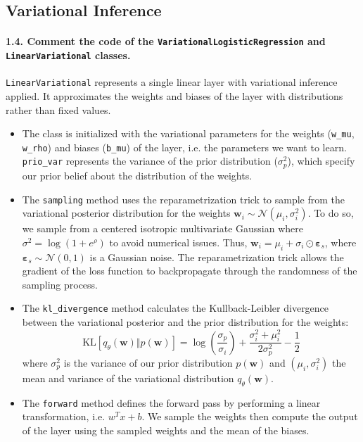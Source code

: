 \subsection{Variational Inference}
\paragraph{1.4. Comment the code of the \texttt{VariationalLogisticRegression} and \texttt{LinearVariational} classes.}

\noindent\texttt{LinearVariational} represents a single linear layer with variational inference applied. It approximates the weights and biases of the layer with distributions rather than fixed values.
\begin{itemize}
    \item The class is initialized with the variational parameters for the weights (\texttt{w\_mu}, \texttt{w\_rho}) and biases (\texttt{b\_mu}) of the layer, i.e. the parameters we want to learn. \texttt{prio\_var} represents the variance of the prior distribution ($\sigma^2_p$), which specify our prior belief about the distribution of the weights. 
    \item The \texttt{sampling} method uses the reparametrization trick to sample from the variational posterior distribution for the weights $\boldsymbol{w}_{i} \sim \mathcal{N}(\mu_{i}, \sigma_{i}^2)$. To do so, we sample from a centered isotropic multivariate Gaussian where $ \sigma^2 = \log(1 + e^{\rho}) $ to avoid numerical issues. Thus, $ \boldsymbol{w}_{i} = \mu_{i}+ \sigma_{i} \odot \boldsymbol{\varepsilon}_s $, where $\boldsymbol{\varepsilon}_s \sim \mathcal{N}(0, 1)$ is a Gaussian noise. The reparametrization trick allows the gradient of the loss function to backpropagate through the randomness of the sampling process. 
    \item The \texttt{kl\_divergence} method calculates the Kullback-Leibler divergence between the variational posterior and the prior distribution for the weights: \[
    \textrm{KL}\left[q_{\theta}(\boldsymbol{w}) \Vert p(\boldsymbol{w}) \right]= \log\left(\frac{\sigma_{p}}{\sigma_{i}}\right) + \frac{\sigma_i^2+\mu_i^2}{2\sigma_{p}^2} - \frac{1}{2} \]
    where $\sigma^2_p$ is the variance of our prior distribution $p(\boldsymbol{w})$ and $(\mu_i, \sigma^2_i)$ the mean and variance of the variational distribution $q_{\theta}(\boldsymbol{w})$.
    \item The \texttt{forward} method defines the forward pass by performing a linear transformation, i.e. $w^T x + b$. We sample the weights then compute the output of the layer using the sampled weights and the mean of the biases.
\end{itemize}

